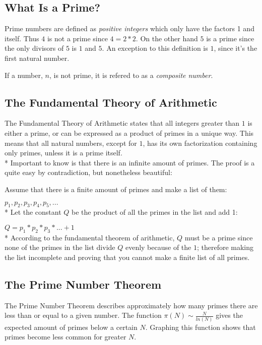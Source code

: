\documentclass[main.tex]{subfiles}
\begin{document}
\subsection{What Is a Prime?}
Prime numbers are defined as \textit{positive integers} which only have the factors 1 and itself. Thus $4$ is not a prime since $4 = 2 * 2$. On the other hand $5$ is a prime since the only divisors of $5$ is $1$ and $5$. An exception to this definition is $1$, since it's the first natural number.

If a number, $n$, is not prime, it is refered to as a \textit{composite number}.

\subsection{The Fundamental Theory of Arithmetic}
The Fundamental Theory of Arithmetic \cite{theorem:arithmetic} states that all integers greater than $1$ is either a prime, or can be expressed as a product of primes in a unique way. This means that all natural numbers, except for $1$, has its own factorization containing only primes, unless it is a prime itself.
\newline
\\*
Important to know is that there is an infinite amount of primes. The proof is a quite easy by contradiction, but nonetheless beautiful:

\begin{mdframed}
    Assume that there is a finite amount of primes and make a list of them:

    $p_1, p_2, p_3, p_4, p_5, ...$ 
    \newline
    \\*
    Let the constant $Q$ be the product of all the primes in the list and add 1:

    $Q = p_1 * p_2 * p_3 * ... + 1$
    \newline
    \\*
    According to the fundamental theorem of arithmetic, $Q$ must be a prime since none of the primes in the list divide $Q$ evenly because of the $1$; therefore making the list incomplete and proving that you cannot make a finite list of all primes. 
\end{mdframed}

\subsection{The Prime Number Theorem}
The Prime Number Theorem \cite{theorem:prime_num} describes approximately how many primes there are less than or equal to a given number. The function $\pi(N) \sim \frac{N}{ln(N)}$ gives the expected amount of primes below a certain $N$. Graphing this function shows that primes become less common for greater $N$.
\end{document}
